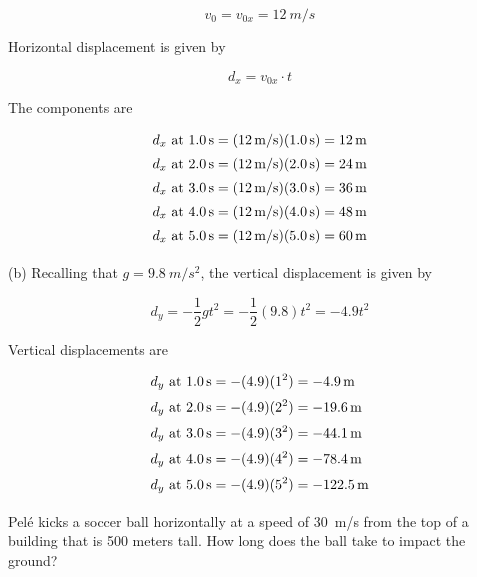 \documentclass[main-physics.tex]{subfiles}
\begin{document}
\begin{equation*}
    v_0 = v_{0x} = \SI{12}{m/s}
\end{equation*}

Horizontal displacement is given by

\begin{equation*}
    d_x = v_{0x} \cdot t
\end{equation*}

The components are

\begin{align*}
    d_x \text{ at \SI{1.0}{s}} &= (\SI{12}{m/s})(\SI{1.0}{s}) = \SI{12}{m}\\[0.5ex]
    d_x \text{ at \SI{2.0}{s}} &= (\SI{12}{m/s})(\SI{2.0}{s}) = \SI{24}{m}\\[0.5ex]
    d_x \text{ at \SI{3.0}{s}} &= (\SI{12}{m/s})(\SI{3.0}{s}) = \SI{36}{m}\\[0.5ex]
    d_x \text{ at \SI{4.0}{s}} &= (\SI{12}{m/s})(\SI{4.0}{s}) = \SI{48}{m}\\[0.5ex]
    d_x \text{ at \SI{5.0}{s}} &= (\SI{12}{m/s})(\SI{5.0}{s}) = \SI{60}{m}\\[0.5ex]
\end{align*}

(b) Recalling that $g=\SI{9.8}{m/s^2}$,  the vertical displacement is given by

\begin{equation*}
    d_y = -\frac{1}{2} g t^2 = -\frac{1}{2}(9.8) t^2 = -4.9 t^2
\end{equation*}

Vertical displacements are
\vspace{-2em}

\begin{align*}
    d_y \text{ at \SI{1.0}{s}} &= -(4.9)(1^2) = -\SI{4.9}{m}\\[0.5ex]
    d_y \text{ at \SI{2.0}{s}} &= -(4.9)(2^2) = -\SI{19.6}{m}\\[0.5ex]
    d_y \text{ at \SI{3.0}{s}} &= -(4.9)(3^2) = -\SI{44.1}{m}\\[0.5ex]
    d_y \text{ at \SI{4.0}{s}} &= -(4.9)(4^2) = -\SI{78.4}{m}\\[0.5ex]
    d_y \text{ at \SI{5.0}{s}} &= -(4.9)(5^2) = -\SI{122.5}{m}\\[0.5ex]
\end{align*}
\vspace{-1em}

\begin{example} \label{i3PZ3N}
    Pel\'{e} kicks a soccer ball horizontally at a speed of \SI{30}{m/s} from the top of a building that is 500 meters tall. How long does the ball take to impact the ground?
\end{example}
\end{document}
